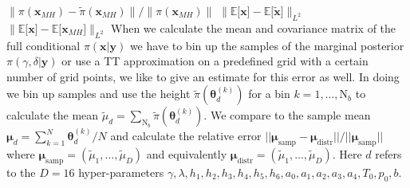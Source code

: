 $\lVert \pi(\bm{x}_{MH}) - \tilde{\pi}(\bm{x}_{MH}) \rVert / \lVert \pi(\bm{x}_{MH}) \rVert$
$\lVert \mathbb{E}\big[ \bm{x} \big]  -  \mathbb{E} \big[ \tilde{\bm{x}} \big] \rVert_{L^2}$
$\lVert \mathbb{E}  \big[\bm{x}\big] -  \mathbb{E} \big[ \bm{x}_{MH}\big]  \rVert_{L^2}$
When we calculate the mean and covariance matrix of the full conditional $\pi(\bm{x}|\bm{y})$ we have to bin up the samples of the marginal posterior $\pi(\gamma, \delta |\bm{y})$ or use a TT approximation on a predefined grid with a certain number of grid points, we like to give an estimate for this error as well.
In doing we bin up samples and use the height $\tilde{\pi}(\bm{\theta}^{(k)}_d)$ for a bin $k = 1, \dots, \text{N}_b$ to calculate the mean $\tilde{\mu}_d = \sum_{\text{N}_b} \tilde{\pi}(\bm{\theta}^{(k)}_d) $.
We compare to the sample mean $\bm{\mu}_d = \sum_{k=1}^N \bm{\theta}^{(k)}_d/N$ and calculate the relative error $||\bm{\mu}_{\text{samp}} -\bm{\mu}_{\text{distr}} ||/ || \bm{\mu}_{\text{samp}} ||$
where $\bm{\mu}_{\text{samp}} =(\tilde{\mu}_1, \dots , \tilde{\mu}_D) $ and equivalently $\bm{\mu}_{\text{distr}} =(\tilde{\mu}_1, \dots , \tilde{\mu}_D) $.
Here $d$ refers to the $D = 16$ hyper-parameters $\gamma, \lambda, h_1, h_2, h_3, h_4, h_5, h_6, a_0, a_1, a_2, a_3, a_4, T_0, p_0, b$.

